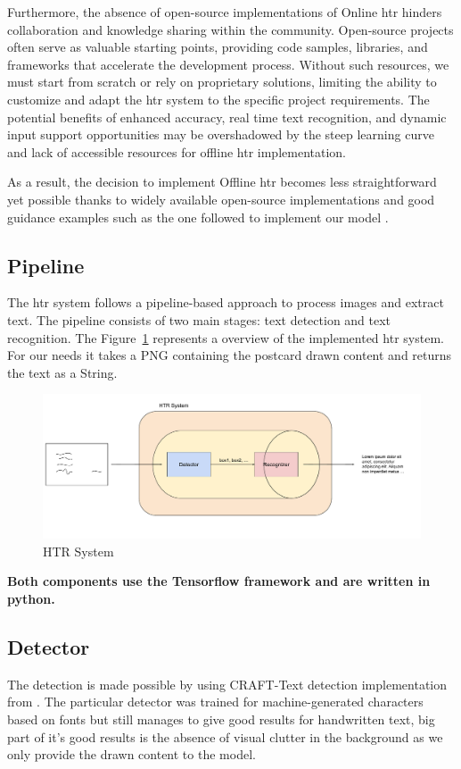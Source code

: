 Furthermore, the absence of open-source implementations of Online \gls{htr} hinders collaboration and knowledge sharing within the community. Open-source projects often serve as valuable starting points, providing code samples, libraries, and frameworks that accelerate the development process. Without such resources, we must start from scratch or rely on proprietary solutions, limiting the ability to customize and adapt the \gls{htr} system to the specific project requirements. The potential benefits of enhanced accuracy,  real time text recognition, and dynamic input support opportunities may be overshadowed by the steep learning curve and lack of accessible resources for offline \gls{htr} implementation.

As a result, the decision to implement Offline \gls{htr} becomes less straightforward yet possible thanks to widely available open-source implementations and good guidance examples such as the one followed to implement our model \textit{\cite{HTR}}.


\subsection{Pipeline}
The \gls{htr} system follows a pipeline-based approach to process images and extract text. The pipeline consists of two main stages: text detection and text recognition.
The Figure~\ref{fig:HTRS} represents a overview of the implemented \gls{htr} system. For our needs it takes a PNG containing the postcard drawn content and returns the text as a String. 

\begin{figure}[!ht]
	\centering
	\includegraphics[trim={ 0.2cm 1cm 0cm 0cm },width=1\textwidth]{./Chapter5/Figures/HTR System}
	\caption{HTR System}
	\label{fig:HTRS}
\end{figure}

\textbf{Both components use the Tensorflow framework and are written in python.}

\subsection{Detector}
The detection is made possible by using CRAFT-Text \textit{\cite{CRAFT-Text}} detection implementation from \textit{\cite{Keras-ocr}}. The particular detector was trained for machine-generated characters based on fonts but still manages to give good results for handwritten text, big part of it's good results is the absence of visual clutter in the background as we only provide the drawn content to the model. 


